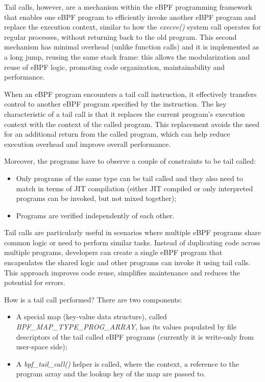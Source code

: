Tail calls, however, are a mechanism within the eBPF programming framework that enables one eBPF program to efficiently invoke another eBPF program and replace the execution context, similar to how the \textit{execve()} system call operates for regular processes, without returning back to the old program.
This second mechanism has minimal overhead (unlike function calls) and it is implemented as a long jump, reusing the same stack frame: this allows the modularization and reuse of eBPF logic, promoting code organization, maintainability and performance.

When an eBPF program encounters a tail call instruction, it effectively transfers control to another eBPF program specified by the instruction.
The key characteristic of a tail call is that it replaces the current program's execution context with the context of the called program. 
This replacement avoids the need for an additional return from the called program, which can help reduce execution overhead and improve overall performance.

Moreover, the programs have to observe a couple of constraints to be tail called:

\begin{itemize}
	\item Only programs of the same type can be tail called and they also need to
		match in terms of JIT compilation (either JIT compiled or only interpreted programs can be invoked, but not mixed together);
	\item Programs are verified independently of each other.
\end{itemize}

Tail calls are particularly useful in scenarios where multiple eBPF programs share common logic or need to perform similar tasks. 
Instead of duplicating code across multiple programs, developers can create a single eBPF program that encapsulates the shared logic and other programs can invoke it using tail calls. 
This approach improves code reuse, simplifies maintenance and reduces the potential for errors.

How is a tail call performed? 
There are two components:

\begin{itemize}
	\item A special map (key-value data structure), called 
		\textit{BPF\_MAP\_TYPE\_PROG\_ARRAY}, has its values populated by file descriptors of the tail called eBPF programs (currently it is write-only from user-space side);
	\item A \textit{bpf\_tail\_call()} helper is called, where the context, a
		reference to the program array and the lookup key of the map are passed to. 
\end{itemize}

